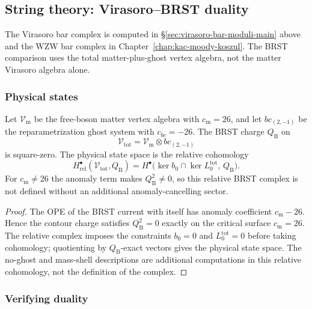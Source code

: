 \subsection{String theory: Virasoro--BRST duality}

The Virasoro bar complex is computed in
\S\ref{sec:virasoro-bar-moduli-main} above and the WZW bar complex in
Chapter~\ref{chap:kac-moody-koszul}. The BRST comparison uses the
total matter-plus-ghost vertex algebra, not the matter Virasoro
algebra alone.

\subsubsection{Physical states}

\begin{theorem}
\label{thm:brst-cohomology}
Let $\mathcal V_{\mathrm m}$ be the free-boson matter vertex algebra
with $c_{\mathrm m}=26$, and let $bc_{(2,-1)}$ be the reparametrization
ghost system with $c_{bc}=-26$. The BRST charge
$Q_{\mathrm B}$ on
\[
\mathcal V_{\mathrm{tot}}
=\mathcal V_{\mathrm m}\otimes bc_{(2,-1)}
\]
is square-zero. The physical state space is the relative cohomology
\[
H^\bullet_{\mathrm{rel}}(\mathcal V_{\mathrm{tot}},Q_{\mathrm B})
=
H^\bullet\bigl(\ker b_0\cap\ker L_0^{\mathrm{tot}},\,Q_{\mathrm B}\bigr).
\]
For $c_{\mathrm m}\neq26$ the anomaly term makes
$Q_{\mathrm B}^2\neq0$, so this relative BRST complex is not defined
without an additional anomaly-cancelling sector.
\end{theorem}

\begin{proof}
The OPE of the BRST current with itself has anomaly coefficient
$c_{\mathrm m}-26$. Hence the contour charge satisfies
$Q_{\mathrm B}^2=0$ exactly on the critical surface
$c_{\mathrm m}=26$. The relative complex imposes the constraints
$b_0=0$ and $L_0^{\mathrm{tot}}=0$ before taking cohomology; quotienting
by $Q_{\mathrm B}$-exact vectors gives the physical state space. The
no-ghost and mass-shell descriptions are additional computations in
this relative cohomology, not the definition of the complex.
\end{proof}

\subsubsection{Verifying duality}

